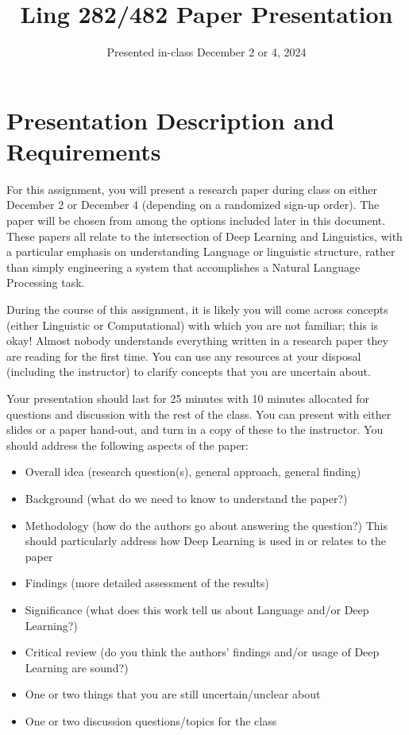 \documentclass[11pt]{article}
\begin{document}
\title{Ling 282/482 Paper Presentation}
\date{\vspace{-0.2in}Presented in-class December 2 or 4, 2024}
\maketitle

\section*{Presentation Description and Requirements}
For this assignment, you will present a research paper during class on either December 2 or December 4 (depending on a randomized sign-up order). The paper will be chosen from among the options included later in this document. These papers all relate to the intersection of Deep Learning and Linguistics, with a particular emphasis on understanding Language or linguistic structure, rather than simply engineering a system that accomplishes a Natural Language Processing task.

During the course of this assignment, it is likely you will come across concepts (either Linguistic or Computational) with which you are not familiar; this is okay! Almost nobody understands everything written in a research paper they are reading for the first time. You can use any resources at your disposal (including the instructor) to clarify concepts that you are uncertain about.

Your presentation should last for 25 minutes with 10 minutes allocated for questions and discussion with the rest of the class. You can present with either slides or a paper hand-out, and turn in a copy of these to the instructor. You should address the following aspects of the paper:
\begin{itemize}
 \item Overall idea (research question(s), general approach, general finding)
 \item Background (what do we need to know to understand the paper?)
 \item Methodology (how do the authors go about answering the question?) This should particularly address how Deep Learning is used in or relates to the paper
 \item Findings (more detailed assessment of the results)
 \item Significance (what does this work tell us about Language and/or Deep Learning?)
 \item Critical review (do you think the authors' findings and/or usage of Deep Learning are sound?)
 \item One or two things that you are still uncertain/unclear about
 \item One or two discussion questions/topics for the class
\end{itemize}
\end{document}
